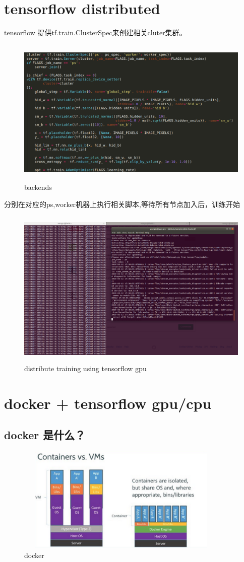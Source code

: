 \documentclass{article}
\begin{document}
\begin{CJK*}{UTF8}{gbsn}
\section{tensorflow distributed}
tensorflow 提供tf.train.ClusterSpec来创建相关cluter集群。
\begin{figure}[H]
\centering
\includegraphics[width=5in,height=2.8in]{tf}
\caption{backends}
\end{figure}
分别在对应的ps,worker机器上执行相关脚本,等待所有节点加入后，训练开始
\begin{figure}[H]
\centering
\includegraphics[width=5in,height=3in]{1}
\caption{distribute training using tensorflow gpu}
\end{figure}
\section{docker + tensorflow gpu/cpu}
\subsection{docker 是什么？}
\begin{figure}[H]
\centering
\includegraphics[width=4in,height=2in]{docker}
\caption{docker}
\end{figure}

\end{CJK*}
\end{document}
